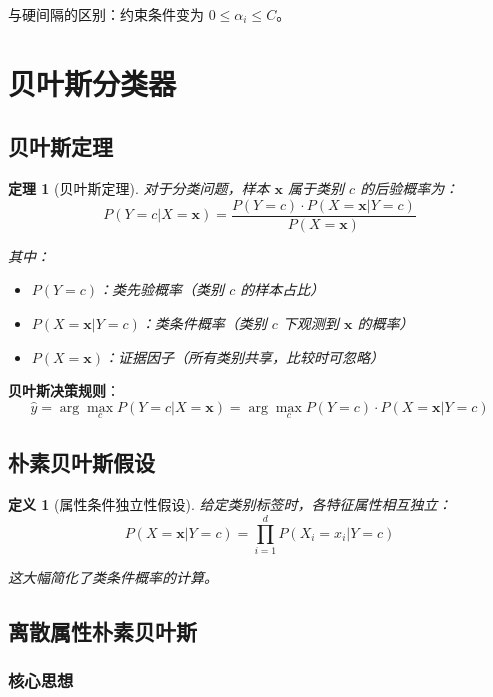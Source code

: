 \documentclass[12pt,a4paper]{ctexart}
\newtheorem{definition}{定义}[section]
\newtheorem{theorem}{定理}[section]
\begin{document}
与硬间隔的区别：约束条件变为 $0 \leq \alpha_i \leq C$。


\section{贝叶斯分类器}

\subsection{贝叶斯定理}

\begin{theorem}[贝叶斯定理]
对于分类问题，样本 $\mathbf{x}$ 属于类别 $c$ 的后验概率为：
\[
P(Y=c | X=\mathbf{x}) = \frac{P(Y=c) \cdot P(X=\mathbf{x} | Y=c)}{P(X=\mathbf{x})}
\]

其中：
\begin{itemize}
    \item $P(Y=c)$：类先验概率（类别 $c$ 的样本占比）
    \item $P(X=\mathbf{x} | Y=c)$：类条件概率（类别 $c$ 下观测到 $\mathbf{x}$ 的概率）
    \item $P(X=\mathbf{x})$：证据因子（所有类别共享，比较时可忽略）
\end{itemize}
\end{theorem}

\textbf{贝叶斯决策规则}：
\[
\hat{y} = \arg\max_{c} P(Y=c | X=\mathbf{x}) = \arg\max_{c} P(Y=c) \cdot P(X=\mathbf{x} | Y=c)
\]

\subsection{朴素贝叶斯假设}

\begin{definition}[属性条件独立性假设]
给定类别标签时，各特征属性相互独立：
\[
P(X=\mathbf{x} | Y=c) = \prod_{i=1}^{d} P(X_i=x_i | Y=c)
\]

这大幅简化了类条件概率的计算。
\end{definition}

\subsection{离散属性朴素贝叶斯}

\subsubsection{核心思想}
\end{document}
